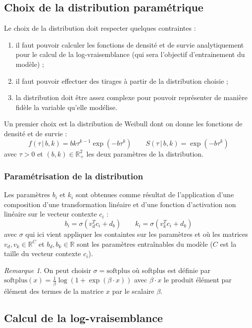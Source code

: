 \documentclass{article}
\theoremstyle{definition}
\theoremstyle{remark}
\newtheorem*{rem}{Remarque}
\begin{document}
\subsection{Choix de la distribution paramétrique}

Le choix de la distribution doit respecter quelques contraintes :
\begin{enumerate}
\item il faut pouvoir calculer les fonctions de densité et de survie
analytiquement pour le calcul de la log-vraisemblance (qui sera l'objectif
d'entrainement du modèle) ;
\item il faut pouvoir effectuer des tirages à partir de la distribution
choisie ;
\item la distribution doit être assez complexe pour pouvoir représenter
de manière fidèle la variable qu'elle modélise.
\end{enumerate}

Un premier choix est la distribution de Weibull dont on donne les
fonctions de densité et de survie :
$$f(\tau \, |\,  b, k) = bk\tau^{k-1}\exp(-b\tau^k)
\quad \quad
S(\tau \, |\,  b, k) = \exp(-b\tau^k)$$
avec $\tau > 0$ et $(b, k) \in \mathbb{R}^2_+$ les deux paramètres de la
distribution.

\subsubsection{Paramétrisation de la distribution}

Les paramètres $b_i$ et $k_i$ sont obtenues comme résultat 
de l'application d'une composition
d'une transformation linéaire et d'une fonction d'activation non linéaire
sur le vecteur contexte $c_i$ :
$$b_i = \sigma(v_d^T c_i + d_b) \quad \quad k_i = \sigma(v_k^T c_i + d_k)$$
avec $\sigma$ qui ici vient appliquer les containtes sur les paramètres
et où les matrices $v_d, v_k \in \mathbb{R}^C$ et $b_d, b_k \in \mathbb{R}$
sont les paramètres entraînables du modèle ($C$ est la taille du vecteur
contexte $c_i$).

\begin{rem}
On peut choisir $\sigma = \text{softplus}$ où softplus est définie par
$\text{softplus}(x) = \frac{1}{\beta} \log(1 + \exp(\beta \cdot x))$ avec
$\beta \cdot x$ le produit élément par élément des termes de la matrice $x$
par le scalaire $\beta$.
\end{rem}

\subsection{Calcul de la log-vraisemblance}
\end{document}
